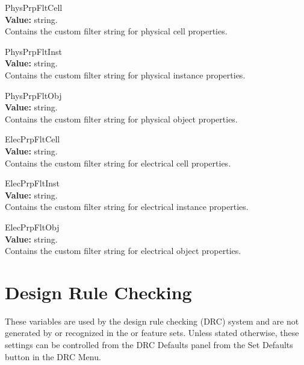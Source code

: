 \begin{description}
\item{\et PhysPrpFltCell}\\
{\bf Value:} string.\\
Contains the custom filter string for physical cell properties.

\item{\et PhysPrpFltInst}\\
{\bf Value:} string.\\
Contains the custom filter string for physical instance properties.

\item{\et PhysPrpFltObj}\\
{\bf Value:} string.\\
Contains the custom filter string for physical object properties.

\item{\et ElecPrpFltCell}\\
{\bf Value:} string.\\
Contains the custom filter string for electrical cell properties.

\item{\et ElecPrpFltInst}\\
{\bf Value:} string.\\
Contains the custom filter string for electrical instance properties.

\item{\et ElecPrpFltObj}\\
{\bf Value:} string.\\
Contains the custom filter string for electrical object properties.
\end{description}


\section{Design Rule Checking}
\label{drcvars}

These variables are used by the design rule checking (DRC) system and
are not generated by or recognized in the {\XicII} or {\Xiv} feature
sets.  Unless stated otherwise, these settings can be controlled from
the {\cb DRC Defaults} panel from the {\cb Set Defaults} button in the
{\cb DRC Menu}.

